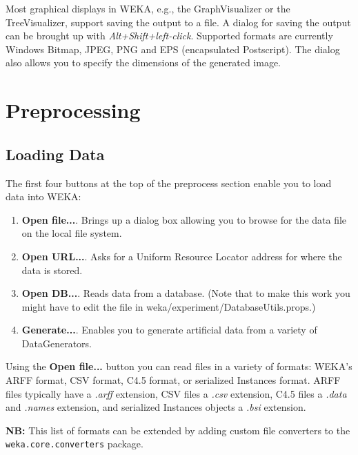 \documentclass[a4paper]{article}
\begin{document}
Most graphical displays in WEKA, e.g., the GraphVisualizer or the
TreeVisualizer, support saving the output to a file. A dialog for saving 
the output can be brought up with \textit{Alt+Shift+left-click}. 
Supported formats are currently Windows Bitmap, JPEG, PNG and EPS 
(encapsulated Postscript). The dialog also allows you to specify the
dimensions of the generated image.

\newpage

\section{Preprocessing}

\begin{center}
\end{center}

\subsection{Loading Data}

The first four buttons at the top of the preprocess section enable
you to load data into WEKA:

\begin{enumerate}
\item \textbf{Open file...}.
Brings up a dialog box allowing you to browse for the data file on the local
file system.
\item \textbf{Open URL...}.
Asks for a Uniform Resource Locator address for where the data is stored.
\item \textbf{Open DB...}.  Reads data from a database. (Note that to
make this work you might have to edit the file in
weka/experiment/DatabaseUtils.props.)
\item \textbf{Generate...}.  Enables you to generate artificial data
from a variety of DataGenerators.
\end{enumerate}
\noindent
Using the \textbf{Open file...} button you can read files in a variety
of formats: WEKA's ARFF format, CSV format, C4.5 format, or serialized
Instances format. ARFF files typically have a {\em .arff\/}
extension, CSV files a {\em .csv\/} extension, C4.5 files a {\em
.data\/} and {\em .names\/} extension, and serialized Instances
objects a {\em .bsi\/} extension. 

\textbf{NB:} This list of formats can be extended by adding custom file 
converters to the \texttt{weka.core.converters} package.
\end{document}
